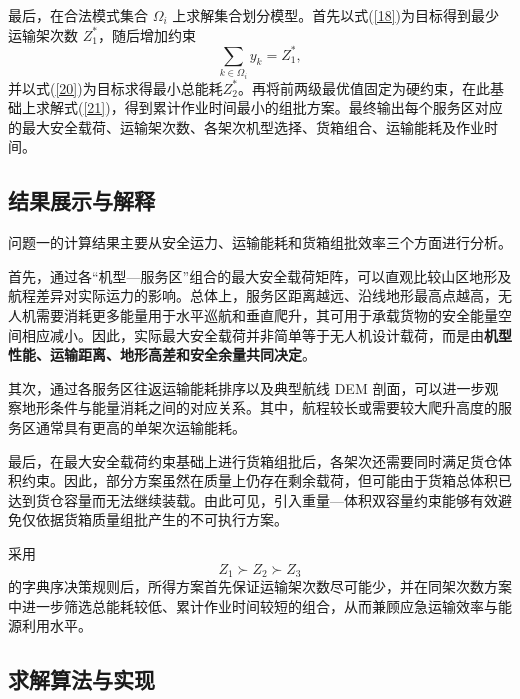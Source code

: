 最后，在合法模式集合 $\Omega_i$ 上求解集合划分模型。首先以式(\ref{18})为目标得到最少运输架次数 $Z_1^*$，随后增加约束
\begin{equation}\label{30}
	\sum_{k \in \Omega_i} y_k = Z_1^*, 
\end{equation}
并以式(\ref{20})为目标求得最小总能耗$Z_2^*$。再将前两级最优值固定为硬约束，在此基础上求解式(\ref{21})，得到累计作业时间最小的组批方案。最终输出每个服务区对应的最大安全载荷、运输架次数、各架次机型选择、货箱组合、运输能耗及作业时间。

\subsection{结果展示与解释}

问题一的计算结果主要从安全运力、运输能耗和货箱组批效率三个方面进行分析。

首先，通过各“机型—服务区”组合的最大安全载荷矩阵，可以直观比较山区地形及航程差异对实际运力的影响。总体上，服务区距离越远、沿线地形最高点越高，无人机需要消耗更多能量用于水平巡航和垂直爬升，其可用于承载货物的安全能量空间相应减小。因此，实际最大安全载荷并非简单等于无人机设计载荷，而是由\textbf{机型性能、运输距离、地形高差和安全余量共同决定}。

其次，通过各服务区往返运输能耗排序以及典型航线 DEM 剖面，可以进一步观察地形条件与能量消耗之间的对应关系。其中，航程较长或需要较大爬升高度的服务区通常具有更高的单架次运输能耗。

最后，在最大安全载荷约束基础上进行货箱组批后，各架次还需要同时满足货仓体积约束。因此，部分方案虽然在质量上仍存在剩余载荷，但可能由于货箱总体积已达到货仓容量而无法继续装载。由此可见，引入重量—体积双容量约束能够有效避免仅依据货箱质量组批产生的不可执行方案。

采用
$$
Z_1 \succ Z_2 \succ Z_3
$$
的字典序决策规则后，所得方案首先保证运输架次数尽可能少，并在同架次数方案中进一步筛选总能耗较低、累计作业时间较短的组合，从而兼顾应急运输效率与能源利用水平。

\subsection{求解算法与实现}

